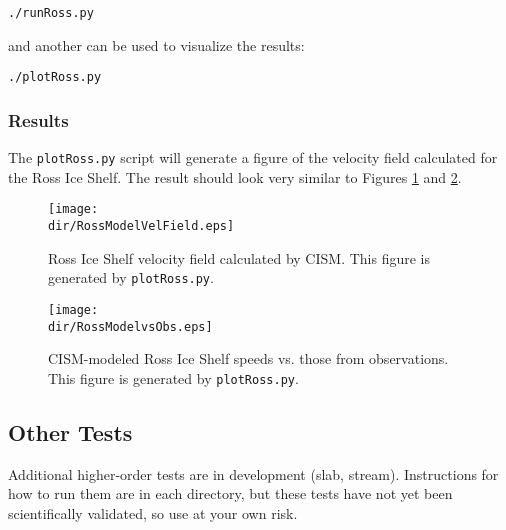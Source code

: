 \texttt{./runRoss.py}

and another can be used to visualize the results:

\texttt{./plotRoss.py}

\subsubsection{Results}
The \texttt{plotRoss.py} script will generate a figure of the velocity field
calculated for the Ross Ice Shelf.  The result should look very similar to Figures \ref{fig:rossresults1} and \ref{fig:rossresults2}.

\begin{figure}[H!]
	\centering
	\texttt{[image: \\dir/RossModelVelField.eps]}
	\caption{Ross Ice Shelf velocity field calculated by CISM. This figure is generated by \texttt{plotRoss.py}.}
	\label{fig:rossresults1}
\end{figure}

\begin{figure}[H!]
	\centering
	\texttt{[image: \\dir/RossModelvsObs.eps]}
	\caption{CISM-modeled Ross Ice Shelf speeds vs. those from observations. This figure is generated by \texttt{plotRoss.py}.}
	\label{fig:rossresults2}
\end{figure}
\FloatBarrier


\subsection{Other Tests}
Additional higher-order tests are in development (slab, stream).  Instructions
for how to run them are in each directory, but these tests have not yet been 
scientifically validated, so use at your own risk.


